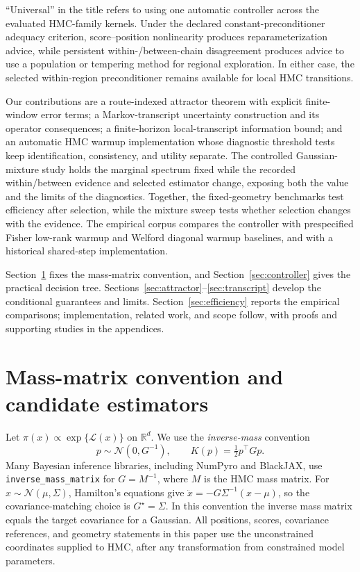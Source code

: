 \documentclass[11pt]{article}
\theoremstyle{plain}
\theoremstyle{definition}
\theoremstyle{remark}
\begin{document}
``Universal'' in the title refers to using one automatic controller across the
evaluated HMC-family kernels. Under the declared constant-preconditioner
adequacy criterion, score--position nonlinearity produces reparameterization
advice, while persistent within-/between-chain disagreement produces advice to
use a population or tempering method for regional exploration. In either case,
the selected within-region preconditioner remains available for local HMC
transitions.

Our contributions are a route-indexed attractor theorem with explicit finite-
window error terms; a Markov-transcript uncertainty construction and its
operator consequences; a finite-horizon local-transcript information bound;
and an automatic HMC warmup implementation whose diagnostic threshold tests
keep identification, consistency, and utility separate. The controlled
Gaussian-mixture study holds the marginal spectrum fixed while the recorded
within/between evidence and selected estimator change, exposing both the value
and the limits of the diagnostics. Together, the fixed-geometry benchmarks test
efficiency after selection, while the mixture sweep tests whether selection
changes with the evidence. The empirical corpus compares the controller
with prespecified Fisher low-rank warmup and Welford diagonal warmup baselines,
and with a historical shared-step implementation.

Section~\ref{sec:setup} fixes the mass-matrix convention, and
Section~\ref{sec:controller} gives the practical decision tree.
Sections~\ref{sec:attractor}--\ref{sec:transcript} develop the conditional
guarantees and limits. Section~\ref{sec:efficiency} reports the empirical
comparisons; implementation, related work, and scope follow, with proofs and
supporting studies in the appendices.

\section{Mass-matrix convention and candidate estimators}\label{sec:setup}

Let $\pi(x)\propto\exp\{\mathcal L(x)\}$ on $\mathbb R^d$. We use the
\emph{inverse-mass} convention
\begin{equation}
  p\sim\mathcal N(0,G^{-1}),\qquad
  K(p)=\tfrac12p^\top Gp.                                    \label{eq:metric}
\end{equation}
Many Bayesian inference libraries, including NumPyro and BlackJAX, use
\texttt{inverse\_mass\_\allowbreak matrix} for $G=M^{-1}$, where $M$ is the HMC mass
matrix. For $x\sim\mathcal N(\mu,\Sigma)$, Hamilton's equations give
$\ddot x=-G\Sigma^{-1}(x-\mu)$, so the covariance-matching choice is
$G^\star=\Sigma$. In this convention the inverse mass matrix equals the target
covariance for a Gaussian.
All positions, scores, covariance references, and geometry statements in this
paper use the unconstrained coordinates supplied to HMC, after any
transformation from constrained model parameters.
\end{document}
